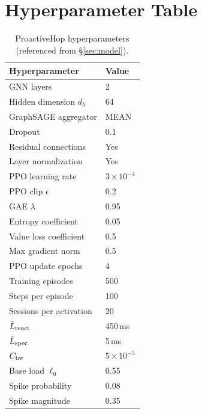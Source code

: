 \documentclass[review,1p]{elsarticle}
\theoremstyle{definition}
\begin{document}



\appendix
\section{Hyperparameter Table}
\label{app:hyperparams}

\begin{table}[h]
\centering
\caption{ProactiveHop hyperparameters (referenced from \S\ref{sec:model}).}
\label{tab:hyperparams}
\begin{tabular}{ll}
\toprule
Hyperparameter & Value \\
\midrule
GNN layers & 2 \\
Hidden dimension $d_h$ & 64 \\
GraphSAGE aggregator & MEAN \\
Dropout & 0.1 \\
Residual connections & Yes \\
Layer normalization & Yes \\
PPO learning rate & $3 \times 10^{-4}$ \\
PPO clip $\epsilon$ & 0.2 \\
GAE $\lambda$ & 0.95 \\
Entropy coefficient & 0.05 \\
Value loss coefficient & 0.5 \\
Max gradient norm & 0.5 \\
PPO update epochs & 4 \\
Training episodes & 500 \\
Steps per episode & 100 \\
Sessions per activation & 20 \\
$\bar{L}_{\rm react}$ & 450\,ms \\
$\bar{L}_{\rm spec}$ & 5\,ms \\
$C_{\rm bw}$ & $5 \times 10^{-5}$ \\
Base load $\ell_0$ & 0.55 \\
Spike probability & 0.08 \\
Spike magnitude & 0.35 \\
\bottomrule
\end{tabular}
\end{table}
\end{document}
